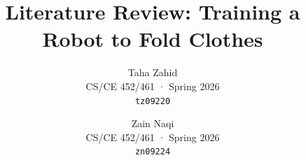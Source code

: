 \documentclass[10pt,twocolumn,letterpaper]{article}
\title{Literature Review: Training a Robot to Fold Clothes}
\author{Taha Zahid\\
CS/CE 452/461 · Spring 2026\\
{\tt\small tz09220}
\and
Zain Naqi\\
CS/CE 452/461 · Spring 2026\\
{\tt\small zn09224}
}
\begin{document}
\maketitle



{
    \small
    
    
}
\end{document}
